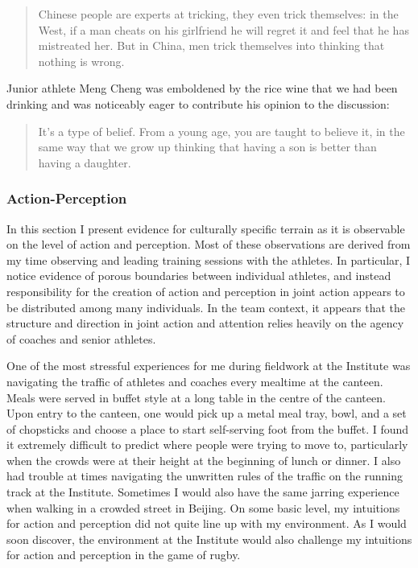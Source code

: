 \begin{CJK}{UTF8}{gbsn}
\begin{quotation}
  Chinese people are experts at tricking, they even trick themselves: in the West, if a man cheats on his girlfriend he will regret it and feel that he has mistreated her.  But in China, men trick themselves into thinking that nothing is wrong.
\end{quotation}

Junior athlete Meng Cheng was emboldened by the rice wine that we had been drinking and was noticeably eager to contribute his opinion to the discussion:

  \begin{quotation}
    It's a type of belief. From a young age, you are taught to believe it, in the same way that we grow up thinking that having a son is better than having a daughter.
  \end{quotation}





\subsubsection{Action-Perception}
In this section I present evidence for culturally specific terrain as it is observable on the level of action and perception.  Most of these observations are derived from my time observing and leading training sessions with the athletes. In particular, I notice evidence of porous boundaries between individual athletes, and instead responsibility for the creation of action and perception in joint action appears to be distributed among many individuals.  In the team context, it appears that the structure and direction in joint action and attention relies heavily on the agency of coaches and senior athletes.

One of the most stressful experiences for me during fieldwork at the Institute was navigating the traffic of athletes and coaches every mealtime at the canteen.  Meals were served in buffet style at a long table in the centre of the canteen. Upon entry to the canteen, one would pick up a metal meal tray, bowl, and a set of chopsticks and choose a place to start self-serving foot from the buffet.  I found it extremely difficult to predict where people were trying to move to, particularly when the crowds were at their height at the beginning of lunch or dinner. I also had trouble at times navigating the unwritten rules of the traffic on the running track at the Institute.  Sometimes I would also have the same jarring experience when walking in a crowded street in Beijing. On some basic level, my intuitions for action and perception did not quite line up with my environment.  As I would soon discover, the environment at the Institute would also challenge my intuitions for action and perception in the game of rugby.


\end{CJK}
